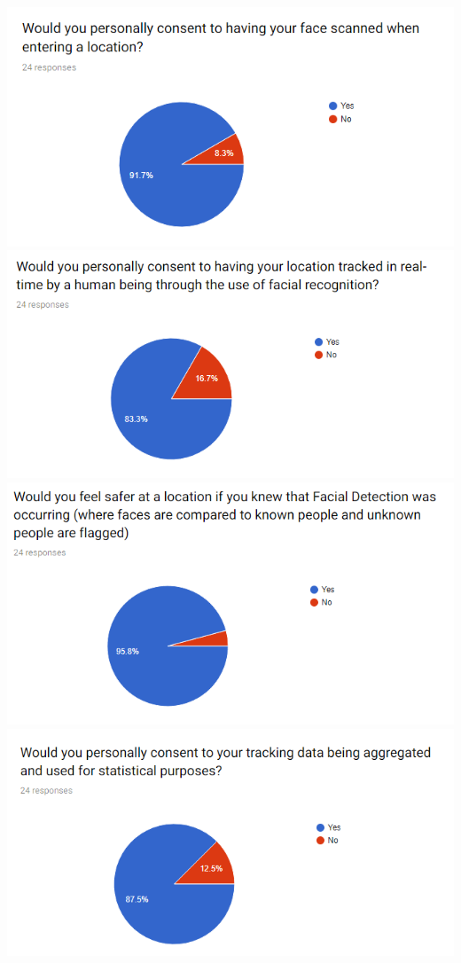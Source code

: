 \documentclass[
  english,
  a4paper,
,tablecaptionabove
]{scrartcl}
\begin{document}
\includegraphics{images/ppm-images/form-1.png}
\includegraphics{images/ppm-images/form-2.png}
\includegraphics{images/ppm-images/form-3.png}
\includegraphics{images/ppm-images/form-4.png} \newpage
\end{document}

